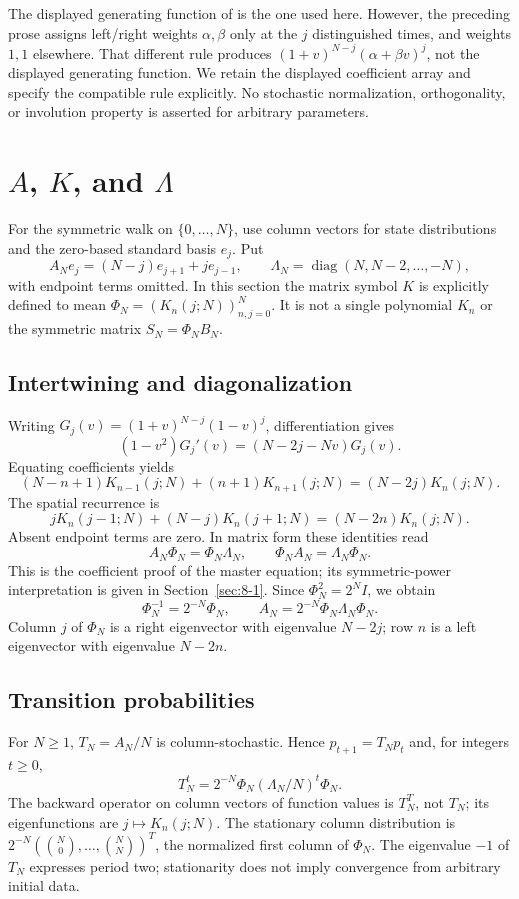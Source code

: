 \begin{remark}
The displayed generating function of \cite[Section~6.2]{KocikFeynman}
is the one used here. However, the preceding prose assigns left/right
weights $\alpha,\beta$ only at the $j$ distinguished times, and weights
$1,1$ elsewhere. That different rule produces
$(1+v)^{N-j}(\alpha+\beta v)^j$, not the displayed generating function.
We retain the displayed coefficient array and specify the compatible
rule explicitly. No stochastic normalization, orthogonality, or
involution property is asserted for arbitrary parameters.
\end{remark}

\section{$A$, $K$, and $\Lambda$}
\label{sec:2-2}
For the symmetric walk on $\{0,\ldots,N\}$, use column vectors for
state distributions and the zero-based standard basis $e_j$. Put
\[
A_Ne_j=(N-j)e_{j+1}+je_{j-1},\qquad
\Lambda_N=\operatorname{diag}(N,N-2,\ldots,-N),
\]
with endpoint terms omitted. In this section the matrix symbol $K$
is explicitly defined to mean $\Phi_N=(K_n(j;N))_{n,j=0}^N$.
It is not a single polynomial $K_n$ or the symmetric matrix
$S_N=\Phi_NB_N$.

\subsection{Intertwining and diagonalization}
Writing $G_j(v)=(1+v)^{N-j}(1-v)^j$, differentiation gives
\[
(1-v^2)G_j'(v)=(N-2j-Nv)G_j(v).
\]
Equating coefficients yields
\[
(N-n+1)K_{n-1}(j;N)+(n+1)K_{n+1}(j;N)
=(N-2j)K_n(j;N).
\]
The spatial recurrence is
\[
jK_n(j-1;N)+(N-j)K_n(j+1;N)=(N-2n)K_n(j;N).
\]
Absent endpoint terms are zero. In matrix form these identities read
\[
A_N\Phi_N=\Phi_N\Lambda_N,\qquad
\Phi_NA_N=\Lambda_N\Phi_N.
\]
This is the coefficient proof of the master equation; its symmetric-power
interpretation is given in Section~\ref{sec:8-1}.
Since $\Phi_N^2=2^NI$, we obtain
\[
\Phi_N^{-1}=2^{-N}\Phi_N,\qquad
A_N=2^{-N}\Phi_N\Lambda_N\Phi_N.
\]
Column $j$ of $\Phi_N$ is a right eigenvector with eigenvalue $N-2j$;
row $n$ is a left eigenvector with eigenvalue $N-2n$.

\subsection{Transition probabilities}
For $N\geq1$, $T_N=A_N/N$ is column-stochastic. Hence
$p_{t+1}=T_Np_t$ and, for integers $t\geq0$,
\[
T_N^t=2^{-N}\Phi_N(\Lambda_N/N)^t\Phi_N.
\]
The backward operator on column vectors of function values is $T_N^T$,
not $T_N$; its eigenfunctions are $j\mapsto K_n(j;N)$.
The stationary column distribution is
$2^{-N}(\binom N0,\ldots,\binom NN)^T$, the normalized first column
of $\Phi_N$. The eigenvalue $-1$ of $T_N$ expresses period two;
stationarity does not imply convergence from arbitrary initial data.

